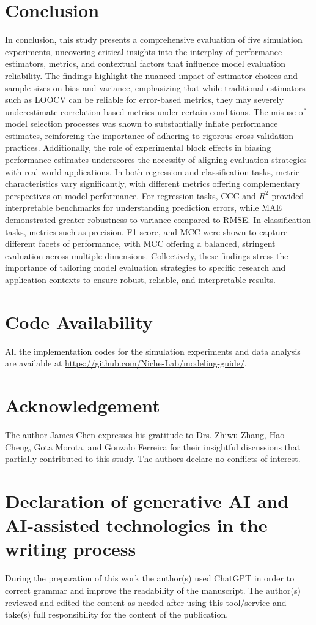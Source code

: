 \section{Conclusion}

In conclusion, this study presents a comprehensive evaluation of five simulation experiments, uncovering critical insights into the interplay of performance estimators, metrics, and contextual factors that influence model evaluation reliability. The findings highlight the nuanced impact of estimator choices and sample sizes on bias and variance, emphasizing that while traditional estimators such as LOOCV can be reliable for error-based metrics, they may severely underestimate correlation-based metrics under certain conditions. The misuse of model selection processes was shown to substantially inflate performance estimates, reinforcing the importance of adhering to rigorous cross-validation practices. Additionally, the role of experimental block effects in biasing performance estimates underscores the necessity of aligning evaluation strategies with real-world applications. In both regression and classification tasks, metric characteristics vary significantly, with different metrics offering complementary perspectives on model performance. For regression tasks, CCC and $R^2$ provided interpretable benchmarks for understanding prediction errors, while MAE demonstrated greater robustness to variance compared to RMSE. In classification tasks, metrics such as precision, F1 score, and MCC were shown to capture different facets of performance, with MCC offering a balanced, stringent evaluation across multiple dimensions. Collectively, these findings stress the importance of tailoring model evaluation strategies to specific research and application contexts to ensure robust, reliable, and interpretable results.

\section{Code Availability}

All the implementation codes for the simulation experiments and data analysis are available at \url{https://github.com/Niche-Lab/modeling-guide/}.

\section{Acknowledgement}

The author James Chen expresses his gratitude to Drs. Zhiwu Zhang, Hao Cheng, Gota Morota, and Gonzalo Ferreira for their insightful discussions that partially contributed to this study. The authors declare no conflicts of interest.

\section*{Declaration of generative AI and AI-assisted technologies in the writing process}

During the preparation of this work the author(s) used ChatGPT in order to correct grammar and improve the readability of the manuscript. The author(s) reviewed and edited the content as needed after using this tool/service and take(s) full responsibility for the content of the publication.